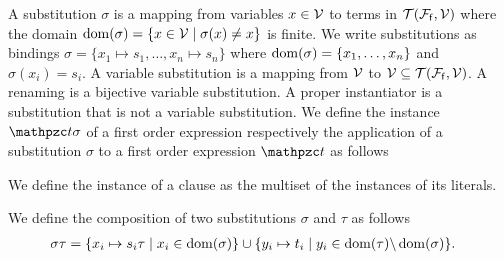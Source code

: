 


\begin{definition}\label{def:substitution}
	A {\myem substitution} $\sigma$ is a mapping from variables $x\in{\mathcal V}$ to terms in ${{\mathcal T}({\mathcal F}_{\mathsf f},{\mathcal V})}$
	where the {\myem domain }$\operatorname{dom}(\sigma) = \{ x\in{\mathcal V}\mid\sigma(x) \neq x \}$ is finite.
	We write substitutions as bindings $\sigma=\{ x_1\mapsto s_1,\ldots,x_n\mapsto s_n \}$
	where $\operatorname{dom}(\sigma)=\{ x_1,\ldots,x_n \}$ and $\sigma(x_i)=s_i$.
	A {\myem variable substitution} is a mapping from ${\mathcal V}$ to ${\mathcal V}\subseteq{{\mathcal T}({\mathcal F}_{\mathsf f},{\mathcal V})}$.
	A {\myem renaming} is a bijective variable substitution.
	A {\myem proper instantiator} is a substitution that is not a variable substitution.
	We define the instance $\mct\sigma$ of a first order expression
	respectively the application of a substitution $\sigma$ to a first order expression $\mct$ as follows

\noindent We define the instance of a clause as the multiset of the instances of its literals.
\end{definition}

\begin{definition}\label{def:substcomp}
We define the {\myem composition} of two substitutions $\sigma$ and $\tau$ as follows
	\begin{align*}
		\sigma\tau&=\{ x_i\mapsto s_i\tau\mid x_i\in\operatorname{dom}(\sigma) \}
		\cup
		\{ y_i\mapsto t_i\mid y_i\in\operatorname{dom}(\tau) \backslash \operatorname{dom}(\sigma) \}.
	\end{align*}
\end{definition}



